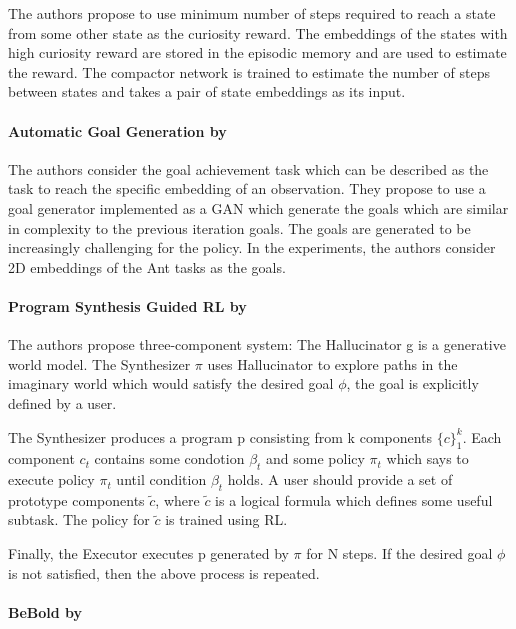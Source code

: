 \documentclass[acmsmall, nonacm]{acmart}
\begin{document}
The authors propose to use minimum number of steps required to reach a state from some other state as the curiosity reward. The embeddings of the states with high curiosity reward are stored in the episodic memory and are used to estimate the reward. The compactor network is trained to estimate the number of steps between states and takes a pair of state embeddings as its input.


\paragraph{Automatic Goal Generation by \citet{pmlr-v80-florensa18a}}

The authors consider the goal achievement task which can be described as the task to reach the specific embedding of an observation. They propose to use a goal generator implemented as a GAN which generate the goals which are similar in complexity to the previous iteration goals. The goals are generated to be increasingly challenging for the policy. In the experiments, the authors consider 2D embeddings of the Ant tasks as the goals.


\paragraph{Program Synthesis Guided RL by \citet{Yang2021ProgramSG}}

The authors propose three-component system: The Hallucinator g is a generative world model. The Synthesizer $\pi$ uses Hallucinator to explore paths in the imaginary world which would satisfy the desired goal $\phi$, the goal is explicitly defined by a user.

The Synthesizer produces a program p consisting from k components $\{c\}_1^k$. Each component $c_t$ contains some condotion $\beta_t$ and some policy $\pi_t$ which says to execute policy $\pi_t$ until condition $\beta_t$ holds. A user should provide a set of prototype components $\tilde{c}$, where $\tilde{c}$ is a logical formula which defines some useful subtask. The policy for $\tilde{c}$ is trained using RL.

Finally, the Executor executes p generated by $\pi$ for N steps. If the desired goal $\phi$ is not satisfied, then the above process is repeated.


\paragraph{BeBold by \citet{Zhang2020BeBoldEB}}
\end{document}
